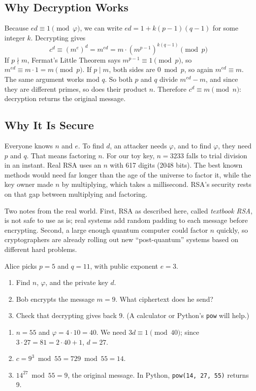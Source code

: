 \subsection{Why Decryption Works}
Because $ed \equiv 1 \pmod{\varphi}$, we can write $ed = 1 + k(p-1)(q-1)$ for some
integer $k$. Decrypting gives
$$c^d \equiv (m^e)^d = m^{ed} = m \cdot \left(m^{p-1}\right)^{k(q-1)} \pmod{p}$$
If $p \nmid m$, Fermat's Little Theorem says $m^{p-1} \equiv 1 \pmod{p}$, so
$m^{ed} \equiv m \cdot 1 = m \pmod{p}$. If $p \mid m$, both sides are $0 \bmod p$,
so again $m^{ed} \equiv m$. The same argument works mod $q$. So both $p$ and $q$
divide $m^{ed} - m$, and since they are different primes, so does their product
$n$. Therefore $c^d \equiv m \pmod{n}$: decryption returns the original message.

\subsection{Why It Is Secure}
Everyone knows $n$ and $e$. To find $d$, an attacker needs $\varphi$, and to
find $\varphi$, they need $p$ and $q$. That means factoring $n$. For our toy
key, $n = 3233$ falls to trial division in an instant. Real RSA uses an $n$ with
617 digits (2048 bits). The best known methods would need far longer than the
age of the universe to factor it, while the key owner made $n$ by multiplying,
which takes a millisecond. RSA's security rests on that gap between multiplying
and factoring.

Two notes from the real world. First, RSA as described here, called
\emph{textbook RSA}, is not safe to use as is; real systems add random padding to
each message before encrypting. Second, a large enough quantum computer could
factor $n$ quickly, so cryptographers are already rolling out new
``post-quantum'' systems based on different hard problems.

\begin{Exercise}[title={RSA by Hand}, label=nt_rsa]
Alice picks $p = 5$ and $q = 11$, with public exponent $e = 3$.
\begin{enumerate}
\item Find $n$, $\varphi$, and the private key $d$.
\item Bob encrypts the message $m = 9$. What ciphertext does he send?
\item Check that decrypting gives back 9. (A calculator or Python's
\texttt{pow} will help.)
\end{enumerate}
\end{Exercise}
\begin{Answer}[ref=nt_rsa]
\begin{enumerate}
\item $n = 55$ and $\varphi = 4 \cdot 10 = 40$. We need $3d \equiv 1 \pmod{40}$;
since $3 \cdot 27 = 81 = 2 \cdot 40 + 1$, $d = 27$.
\item $c = 9^3 \bmod 55 = 729 \bmod 55 = 14$.
\item $14^{27} \bmod 55 = 9$, the original message. In Python,
\texttt{pow(14, 27, 55)} returns 9.
\end{enumerate}
\end{Answer}

